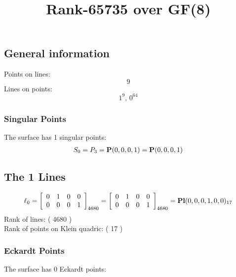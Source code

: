 \documentclass{article}
\newcommand\setTBstruts{\def\T{\rule{0pt}{2.6ex}}%
\def\B{\rule[-1.2ex]{0pt}{0pt}}}
\newcommand{\bP}{{\bf P}}
\begin{document}
 
\setTBstruts



{\allowdisplaybreaks%






\title{Rank-65735 over GF(8)}
\author{}%
\maketitle%
%
{}



\subsection*{General information}
Points on lines:
$$
9$$
Lines on points:
$$
1^9,\,0^{64}$$
\subsubsection*{Singular Points}
The surface has 1 singular points:\\
\begin{align*}
S_{0} &= P_{3}=\bP(0, 0, 0, 1) = \bP(0, 0, 0, 1)\\
\end{align*}
\subsection*{The 1 Lines}
$$
\ell_{0} = 
\left[
\begin{array}{*{4}{r}}
0 & 1 & 0 & 0\\
0 & 0 & 0 & 1\\
\end{array}
\right]
_{4680}
=
\left[
\begin{array}{*{4}c}
0  & 1  & 0  & 0\\
0  & 0  & 0  & 1\\
\end{array}
\right]_{4680}
={\rm\bf Pl}(0,0,0,1,0,0 )_{17}$$
Rank of lines: ( 4680 )\\
Rank of points on Klein quadric: ( 17 )\\
\subsubsection*{Eckardt Points}
The surface has 0 Eckardt points:\\
}
\end{document}
